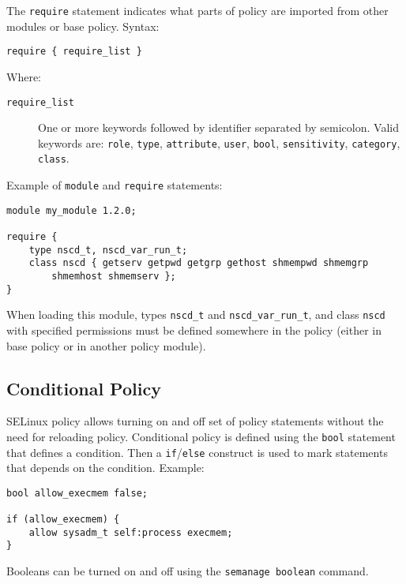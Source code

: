 The \texttt{require} statement indicates what parts of policy are imported from
other modules or base policy. Syntax:
\begin{lstlisting}[language=te]
require { require_list }
\end{lstlisting}
Where:
\begin{description}
    \item [\texttt{require\_list}] One or more keywords followed by identifier
        separated by semicolon. Valid keywords are: \texttt{role},
        \texttt{type}, \texttt{attribute}, \texttt{user}, \texttt{bool},
        \texttt{sensitivity}, \texttt{category}, \texttt{class}.
\end{description}

Example of \texttt{module} and \texttt{require} statements:
\begin{lstlisting}[language=te]
module my_module 1.2.0;

require {
    type nscd_t, nscd_var_run_t;
    class nscd { getserv getpwd getgrp gethost shmempwd shmemgrp
        shmemhost shmemserv };
}
\end{lstlisting}
When loading this module, types \texttt{nscd\_t} and \texttt{nscd\_var\_run\_t},
and class \texttt{nscd} with specified permissions must be defined somewhere in
the policy (either in base policy or in another policy module).

\subsection{Conditional Policy}
\label{booleans}
SELinux policy allows turning on and off set of policy statements without the
need for reloading policy. Conditional policy is defined using the \texttt{bool}
statement that defines a condition. Then a \texttt{if}/\texttt{else} construct
is used to mark statements that depends on the condition. Example:
\begin{lstlisting}[language=te]
bool allow_execmem false;

if (allow_execmem) {
    allow sysadm_t self:process execmem;
}
\end{lstlisting}
Booleans can be turned on and off using the \texttt{semanage boolean} command.

